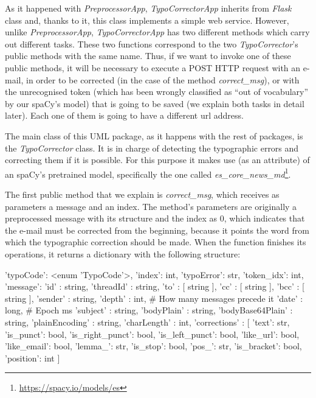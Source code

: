 As it happened with \textit{PreprocessorApp}, \textit{TypoCorrectorApp} inherits from \textit{Flask} class and, thanks to it, this class implements a simple web service. However, unlike \textit{PreprocessorApp}, \textit{TypoCorrectorApp} has two different methods which carry out different tasks. These two functions correspond to the two \textit{TypoCorrector}'s public methods with the same name. Thus, if we want to invoke one of these public methods, it will be necessary to execute a POST HTTP request with an e-mail, in order to be corrected (in the case of the method \textit{correct\_msg}), or with the unrecognised token (which has been wrongly classified as ``out of vocabulary'' by our spaCy's model) that is going to be saved (we explain both tasks in detail later). Each one of them is going to have a different url address.

The main class of this UML package, as it happens with the rest of packages, is the \textit{TypoCorrector} class. It is in charge of detecting the typographic errors and correcting them if it is possible. For this purpose it makes use (as an attribute) of an spaCy's pretrained model, specifically the one called \textit{es\_core\_news\_md}\footnote{\url{https://spacy.io/models/es}}.

The first public method that we explain is \textit{correct\_msg}, which receives as parameters a message and an index. The method's parameters are originally a preprocessed message with its structure and the index as 0, which indicates that the e-mail must be corrected from the beginning, because it points the word from which the typographic correction should be made. When the function finishes its operations, it returns a dictionary with the following structure:

\begin{python}
{
	'typoCode': <enum 'TypoCode'>,
	'index': int,
	'typoError': str,
	'token_idx': int,
	'message': {
		'id' : string,
		'threadId' : string,
		'to' : [ string ],
		'cc' : [ string ],
		'bcc' : [ string ],
		'sender' : string,
		'depth' : int,               # How many messages precede it
		'date' : long,               # Epoch ms
		'subject' : string,
		'bodyPlain' : string,
		'bodyBase64Plain' : string,
		'plainEncoding' : string,
		'charLength' : int,
		'corrections' : [
		{
			'text': str,
			'is_punct': bool,
			'is_right_punct': bool,
			'is_left_punct': bool,
			'like_url': bool,
			'like_email': bool,
			'lemma_': str,
			'is_stop': bool,
			'pos_': str,
			'is_bracket': bool,
			'position': int
		}
		]
	}
}
\end{python}

